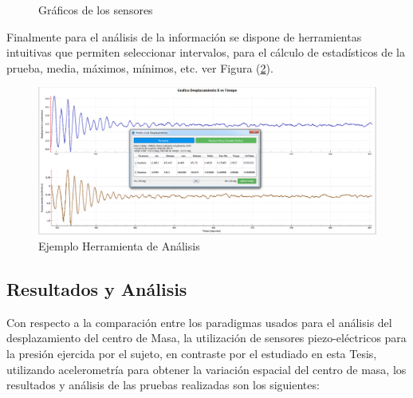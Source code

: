 \documentclass[12pt,a4paper]{article}
\begin{document}
\begin{figure}[H]
	\centering
	\caption{Gráficos de los sensores}
	\label{fig:Graficosensores}
\end{figure}

Finalmente para el análisis de la información se dispone de herramientas intuitivas que permiten seleccionar intervalos, para el cálculo de estadísticos de la prueba, media, máximos, mínimos, etc. ver Figura (\ref{fig:analsisGraficos}).

\begin{figure}[H]
	\centering
	\includegraphics[scale=0.3]{images/analisisGraficos}
	\caption{Ejemplo Herramienta de Análisis}
	\label{fig:analsisGraficos}
\end{figure}


\subsection{Resultados y Análisis}
Con respecto a la comparación entre los paradigmas usados para el análisis del desplazamiento del centro de Masa, la utilización de sensores piezo-eléctricos para la presión ejercida por el sujeto, en contraste por el estudiado en esta Tesis, utilizando acelerometría para obtener la variación espacial del centro de masa, los resultados y análisis de las pruebas realizadas son los siguientes:
\end{document}
